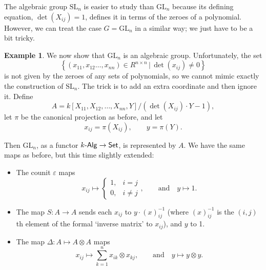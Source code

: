 \documentclass[a4paper,10pt]{scrreprt}
\newcommand{\SL}{\mathrm{SL}}
\newcommand{\GL}{\mathrm{GL}}
\def\mhyp{{\hbox{-}}}
\theoremstyle{definition}
\newtheorem{example}{Example}[section]
\theoremstyle{plain}
\theoremstyle{remark}
\begin{document}
The algebraic group $\SL_{n}$ is easier to study than $\GL_{n}$ because its defining equation, $\det(X_{ij}) = 1$, defines it in terms of the zeroes of a polynomial. However, we can treat the case $G = \GL_{n}$ in a similar way; we just have to be a bit tricky.

\begin{example}
  \label{eg:glnisanalgebraicgroup}
  We now show that $\GL_{n}$ is an algebraic group. Unfortunately, the set
  \begin{equation*}
    \left\{ (x_{11}, x_{12} \ldots, x_{nn}) \in R^{n \times n}\,\big|\, \det(x_{ij}) \neq 0 \right\}
  \end{equation*}
  is not given by the zeroes of any sets of polynomials, so we cannot mimic exactly the construction of $\SL_{n}$. The trick is to add an extra coordinate and then ignore it. Define
  \begin{equation*}
    A = k[X_{11}, X_{12}, \ldots, X_{nn}, Y] / (\det(X_{ij})\cdot Y - 1),
  \end{equation*}
  let $\pi$ be the canonical projection as before, and let
  \begin{equation*}
    x_{ij} = \pi(X_{ij}),\qquad y = \pi(Y).
  \end{equation*}

  Then $\GL_{n}$, as a functor $k\mhyp\mathsf{Alg} \to \mathsf{Set}$, is represented by $A$. We have the same maps as before, but this time slightly extended:
  \begin{itemize}
    \item The counit $\varepsilon$ maps 
      \begin{equation*}
        x_{ij} \mapsto 
        \begin{cases}
          1, &i = j\\
          0, &i \neq j
        \end{cases},
        \qquad\text{and}\quad y \mapsto 1.
      \end{equation*}

    \item The map $S\colon A \to A$ sends each $x_{ij}$ to $y\cdot(x)_{ij}^{-1}$ (where $(x)_{ij}^{-1}$ is the $(i,j)$th element of the formal `inverse matrix' to $x_{ij}$), and $y$ to 1.

    \item The map $\Delta\colon A \mapsto A \otimes A$ maps
      \begin{equation*}
        x_{ij} \mapsto \sum_{k=1}^{n} x_{ik} \otimes x_{kj},\qquad\text{and}\quad y \mapsto y \otimes y.
      \end{equation*}
  \end{itemize}
\end{example}
\end{document}
